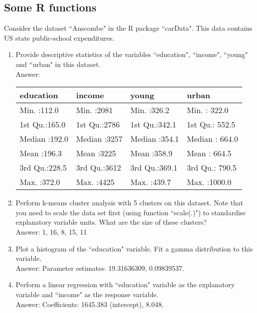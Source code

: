\documentclass[11pt,a4paper,onecolumn]{article}
\begin{document}
\subsection{Some R functions}
 Consider the dataset ``Anscombe" in the R package ``carData". This data contains US state public-school expenditures.
\begin{enumerate}
	\item Provide descriptive statistics of the variables ``education", ``income", ``young" and ``urban" in this dataset. \\
	Answer:\\
	\begin{table}[ht]
		\centering
		\begin{tabular}{llll}
			\hline
			 education &     income &     young &     urban \\
			\hline
			Min.   :112.0   & Min.   :2081   & Min.   :326.2   & Min.   : 322.0   \\
			1st Qu.:165.0   & 1st Qu.:2786   & 1st Qu.:342.1   & 1st Qu.: 552.5   \\
			Median :192.0   & Median :3257   & Median :354.1   & Median : 664.0   \\
			Mean   :196.3   & Mean   :3225   & Mean   :358.9   & Mean   : 664.5   \\
			3rd Qu.:228.5   & 3rd Qu.:3612   & 3rd Qu.:369.1   & 3rd Qu.: 790.5   \\
			Max.   :372.0   & Max.   :4425   & Max.   :439.7   & Max.   :1000.0   \\
			\hline
		\end{tabular}
	\end{table}
\item Perform k-means cluster analysis with 5 clusters on this dataset. Note that you need to scale the data set first (using function ``scale(.)") to standardise explanatory variable units. What are the size of these clusters?\\
Answer: 1, 16, 8, 15, 11
\item Plot a histogram of the ``education" variable. Fit a gamma distribution to this variable. \\
Answer: Parameter estimates: 19.31636309,    0.09839537.
\item Perform a linear regression with ``education" variable as the explanatory variable and ``income" as the response variable. \\
Answer: Coefficients: 1645.383 (intercept), 8.048.
\end{enumerate}
\end{document}
